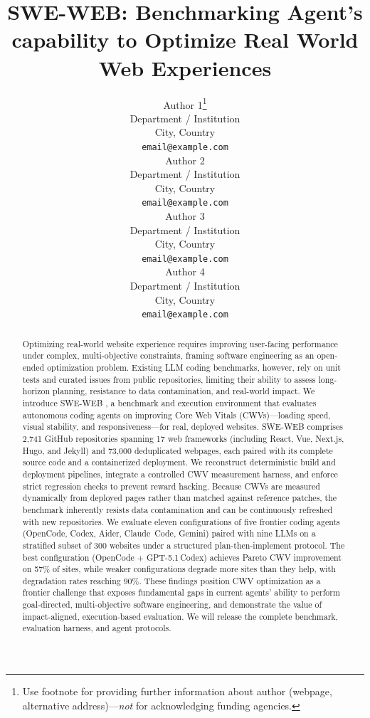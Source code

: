 \documentclass{article}
\title{SWE-WEB: Benchmarking Agent's capability to Optimize Real World Web Experiences}
\author{%
  Author 1\thanks{Use footnote for providing further information about
    author (webpage, alternative address)---\emph{not} for acknowledging
    funding agencies.} \\
  Department / Institution \\
  City, Country \\
  \texttt{email@example.com} \\
  \And
  Author 2 \\
  Department / Institution \\
  City, Country \\
  \texttt{email@example.com} \\
  \And
  Author 3 \\
  Department / Institution \\
  City, Country \\
  \texttt{email@example.com} \\
  \And
  Author 4 \\
  Department / Institution \\
  City, Country \\
  \texttt{email@example.com} \\
}
\newcommand{\OurBench}{SWE-WEB }
\begin{document}
\maketitle

\begin{abstract}
Optimizing real-world website experience requires improving user-facing
performance under complex, multi-objective constraints, framing software
engineering as an open-ended optimization problem. Existing LLM coding
benchmarks, however, rely on unit tests and curated issues from public
repositories, limiting their ability to assess long-horizon planning,
resistance to data contamination, and real-world impact. We introduce
\OurBench, a benchmark and execution environment that evaluates autonomous
coding agents on improving Core Web Vitals (CWVs)---loading speed, visual
stability, and responsiveness---for real, deployed websites.
\OurBench comprises 2{,}741 GitHub repositories spanning 17 web
frameworks (including React, Vue, Next.js, Hugo, and Jekyll) and
73{,}000 deduplicated webpages, each paired with its complete source code
and a containerized deployment. We reconstruct deterministic build and deployment
pipelines, integrate a controlled CWV measurement harness, and enforce
strict regression checks to prevent reward hacking. Because CWVs are
measured dynamically from deployed pages rather than matched against
reference patches, the benchmark inherently resists data contamination and
can be continuously refreshed with new repositories. We evaluate eleven
configurations of five frontier coding agents (OpenCode, Codex, Aider,
Claude~Code, Gemini) paired with nine LLMs on a stratified subset of 300
websites under a structured plan-then-implement protocol. The best
configuration (OpenCode + GPT-5.1\,Codex) achieves Pareto CWV improvement
on 57\% of sites, while weaker configurations degrade more sites than they
help, with degradation rates reaching 90\%. These findings position CWV optimization as a
frontier challenge that exposes fundamental gaps in current agents' ability
to perform goal-directed, multi-objective software engineering, and
demonstrate the value of impact-aligned, execution-based evaluation. We
will release the complete benchmark, evaluation harness, and agent
protocols.
\end{abstract}


















\appendix







\end{document}
